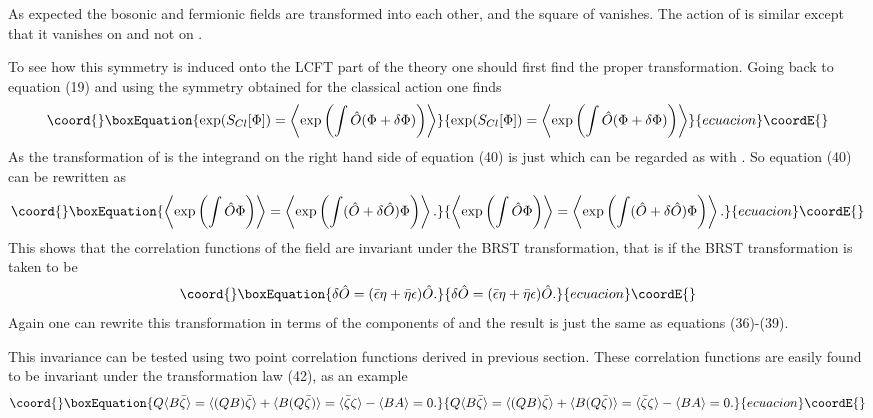 \documentclass[a4paper,11pt]{article}
\begin{document}
As expected the bosonic and fermionic fields are transformed into
each other, and the square of \coordHE{} vanishes. The action of
\coordHE{} is similar except that it vanishes on \myHighlight{$\bar{\alpha}$}\coordHE{}
and not on \myHighlight{$\alpha$}\coordHE{}.

To see how this symmetry is induced onto the LCFT part of the
theory one should first find the proper transformation. Going back
to equation (19) and using the symmetry obtained for the classical
action one finds
\begin{equation}\coord{}\boxEquation{
\exp(S_{Cl}[\Phi])=
\left\langle\exp \left(\int\hat{O}(\Phi+ \delta\Phi)\right)
\right\rangle
}{
\exp(S_{Cl}[\Phi])=
\left\langle\exp \left(\int\hat{O}(\Phi+ \delta\Phi)\right)
\right\rangle
}{ecuacion}\coordE{}\end{equation}
As the transformation of \myHighlight{$\Phi$}\coordHE{} is \myHighlight{$(\bar{\epsilon}\eta +
\bar{\eta}\epsilon)\Phi$}\coordHE{} the integrand on the right hand side of
equation (40) is just \coordHE{} which can be regarded as
\coordHE{} with
\coordHE{}.
So equation (40) can be rewritten as
\begin{equation}\coord{}\boxEquation{
\left\langle\exp\left(\int\hat{O}\Phi\right)\right\rangle=
\left\langle\exp\left(\int(\hat{O}+\delta\hat{O})
\Phi\right)\right\rangle.
}{
\left\langle\exp\left(\int\hat{O}\Phi\right)\right\rangle=
\left\langle\exp\left(\int(\hat{O}+\delta\hat{O})
\Phi\right)\right\rangle.
}{ecuacion}\coordE{}\end{equation}
This shows that the correlation functions of the \coordHE{} field
are invariant under the BRST transformation, that is
\coordHE{} if the
BRST transformation is taken to be
\begin{equation}\coord{}\boxEquation{
\delta \hat{O}=(\bar{\epsilon}\eta + \bar{\eta}\epsilon)\hat{O}.
}{
\delta \hat{O}=(\bar{\epsilon}\eta + \bar{\eta}\epsilon)\hat{O}.
}{ecuacion}\coordE{}\end{equation}
Again one can rewrite this transformation in terms of the
components of \coordHE{} and the result is just the same as
equations (36)-(39).

This invariance can be tested using two point correlation
functions derived in previous section. These correlation functions
are easily found to be invariant under the transformation law
(42), as an example
\begin{equation}\coord{}\boxEquation{\label{example}
Q \langle B \bar{\zeta}\rangle= \langle (Q B) \bar{\zeta}\rangle+
\langle B (Q \bar{\zeta}) \rangle= \langle\bar{\zeta}\zeta\rangle
- \langle BA\rangle=0.
}{Q \langle B \bar{\zeta}\rangle= \langle (Q B) \bar{\zeta}\rangle+
\langle B (Q \bar{\zeta}) \rangle= \langle\bar{\zeta}\zeta\rangle
- \langle BA\rangle=0.
}{ecuacion}\coordE{}\end{equation}
\end{document}
